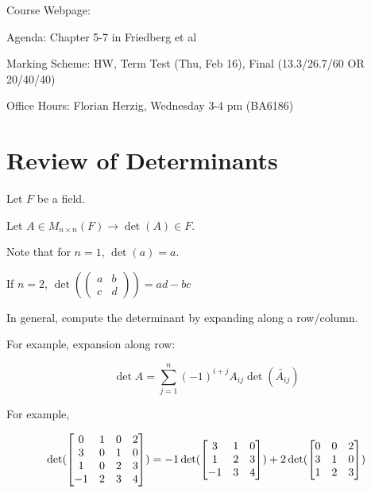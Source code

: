 \documentclass[11pt]{scrartcl}
\begin{document}
Course Webpage:

Agenda: Chapter 5-7 in Friedberg et al

Marking Scheme: HW, Term Test (Thu, Feb 16), Final (13.3/26.7/60 OR
20/40/40)

Office Hours: Florian Herzig, Wednesday 3-4 pm (BA6186)

\section{Review of Determinants}
\label{sec:det}

Let \(F\) be a field.

Let \(A\in M_{n\times n}(F) \to \det(A) \in F\).

Note that for \(n=1\), \(\det(a) = a\).

If \(n=2\), \(\det(\begin{pmatrix}
                     a & b\\
                     c & d
                   \end{pmatrix}) = ad-bc
                   \)

In general, compute the determinant by expanding along a row/column.

For example, expansion along row:

\[
  \det A = \sum_{j=1} ^{n} (-1)^{i+j}A_{ij} \det(\tilde{A_{ij}})
\]

For example,

\[
  \det(\begin{bmatrix}
    0 & 1 & 0 & 2\\
    3 & 0 & 1 & 0\\
    1 & 0 & 2 & 3\\
    -1 & 2 & 3 & 4
  \end{bmatrix}) = -1 \* \det(\begin{bmatrix}
    3 & 1 & 0\\
    1 & 2 & 3\\
    -1 & 3 &4
  \end{bmatrix}) + 2 \det(\begin{bmatrix}
    0 & 0 & 2\\
    3 & 1 & 0\\
    1 & 2 & 3
  \end{bmatrix})
\]
\end{document}
